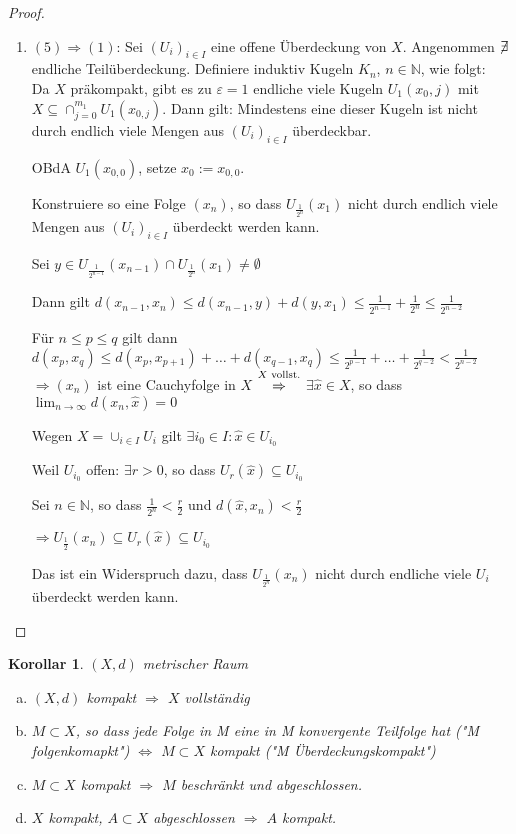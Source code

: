 \documentclass[ngerman]{report}
\theoremstyle{plain}%
\newtheorem{cor}[thm]{Korollar}
\theoremstyle{definition}%
\theoremstyle{myStyle}
\newcommand{\N}{\mathbb{N}}
\newcommand{\df}[1][]{%
	\overset{#1}{\Rightarrow}
}
\newcommand{\limes}[1][\infty]{\lim_{n \to #1}}
\newcommand{\afs}{"{}}
\begin{document}
\begin{proof}
\begin{enumerate}[]
			\item $(5) \df (1)$: Sei $(U_i)_{i\in I}$ eine offene Überdeckung von $X$.
			Angenommen $\centernot\exists$ endliche Teilüberdeckung. Definiere induktiv Kugeln $K_n$, $n\in\N$, wie folgt:\\
			Da $X$ präkompakt, gibt es zu $\varepsilon = 1$ endliche viele Kugeln $U_1(x_0,j)$ mit 
			$X \subseteq \cap_{j=0}^{m_1} U_1(x_{0,j})$.
			Dann gilt: Mindestens eine dieser Kugeln ist nicht durch endlich viele Mengen aus $(U_i)_{i\in I}$ überdeckbar.\par
			OBdA $U_1(x_{0,0})$, setze $x_0 := x_{0,0}$. \par
			Konstruiere so eine Folge $(x_n)$, so dass $U_{\frac{1}{2^n}}(x_1)$ nicht durch endlich viele Mengen aus $(U_i)_{i\in I}$ überdeckt werden kann. \par
			Sei $y \in U_{\frac{1}{2^{n-1}}}(x_{n-1}) \cap U_{\frac{1}{2^n}}(x_1) \neq \emptyset$ \par
			Dann gilt $d(x_{n-1},x_n) \leq d(x_{n-1},y) + d(y,x_1) \leq \frac{1}{2^{n-1}} + \frac{1}{2^n} \leq \frac{1}{2^{n-2}}$ \par
			Für $n \leq p \leq q$ gilt dann $d(x_p,x_q) \leq d(x_p,x_{p+1}) + \dots + d(x_{q-1},x_{q})
			\leq \frac{1}{2^{p-1}} + \dots + \frac{1}{2^{q-2}} < \frac{1}{2^{n-2}}$
			$\df (x_n)$ ist eine Cauchyfolge in $X$ $\overset{X\text{ vollst.}}{\df}$ 
			$\exists  \hat{x} \in X$, so dass $\limes d(x_n,\hat{x}) = 0$\par
			Wegen $X = \cup_{i\in I} U_i$ gilt $\exists i_0\in I: \hat{x}\in U_{i_0}$\par
			Weil $U_{i_0}$ offen: $\exists r>0$, so dass $U_r(\hat{x}) \subseteq U_{i_0}$\par
			Sei  $n\in \N$, so dass $\frac{1}{2^n} < \frac{r}{2}$ und $d(\hat{x}, x_n) < \frac{r}{2}$\par
			$\df U_{\frac{1}{2}} (x_n) \subseteq U_r(\hat{x}) \subseteq U_{i_0}$\par
			Das ist ein Widerspruch dazu, dass $U_{\frac{1}{2^n}}(x_n)$ nicht durch endliche viele $U_i$ überdeckt werden kann.
		\end{enumerate}
	\end{proof}

	\begin{cor}
		$(X,d)$ metrischer Raum
			\begin{enumerate}[a)]
				\item $(X,d)$ kompakt $\df$ $X$ vollständig
				\item $M\subset X$, so dass jede Folge in M eine in M konvergente Teilfolge hat (\afs M folgenkomapkt\afs)
					$\Leftrightarrow$ $M \subset X$ kompakt (\afs M Überdeckungskompakt\afs)
				\item $M\subset X$ kompakt $\df$ $M$ beschränkt und abgeschlossen.
				\item $X$ kompakt, $A \subset X$ abgeschlossen $\df$ $A$ kompakt.
			\end{enumerate}
	\end{cor}
\end{document}
